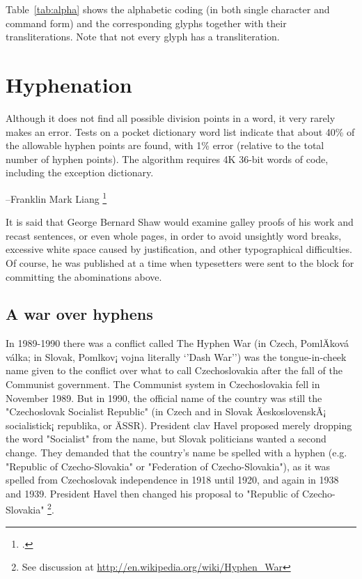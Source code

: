 Table~\ref{tab:alpha} 
shows the alphabetic coding (in both single
character and command form) and the corresponding glyphs together with their
transliterations. Note that not every glyph has a transliteration.

\begin{comment}

\begin{center}
  \Large\cartouche{\pmglyph{K:l-i-o-p-a-d:r-a}}
\end{center}
\end{comment}

\chapter{Hyphenation}
\label{ch:hyphenation}

\epigraph{Although it does not find all possible division points in a word, it very rarely makes an error. Tests on a pocket dictionary word list indicate that about 40\% of the allowable hyphen points are found, with 1\% error (relative to the total number of hyphen points). The algorithm requires 4K 36-bit words of code, including the exception dictionary.}{--Franklin Mark Liang \footcite{liang83}}

\label{ch:hyphenation} 
It is said that George Bernard Shaw would examine galley proofs of his work and recast sentences, or even whole pages, in order to avoid unsightly word breaks, excessive white space caused by justification, and other typographical difficulties. Of course, he was published at a time when typesetters were sent to the block for committing the abominations above.\cite{Major1991} 

\section{A war over hyphens}

In 1989-1990 there was a conflict called The Hyphen War (in Czech, PomlÄkov\'a v\' alka; in Slovak, Pomlkov¡ vojna literally `'Dash War'') was the tongue-in-cheek name given to the conflict over what to call Czechoslovakia after the fall of the Communist government. The Communist system in Czechoslovakia fell in November 1989. But in 1990, the official name of the country was still the "Czechoslovak Socialist Republic" (in Czech and in Slovak ÄeskoslovenskÃ¡ socialistick¡ republika, or ÄSSR). President clav Havel proposed merely dropping the word "Socialist" from the name, but Slovak politicians wanted a second change. They demanded that the country's name be spelled with a hyphen (e.g. "Republic of Czecho-Slovakia" or "Federation of Czecho-Slovakia"), as it was spelled from Czechoslovak independence in 1918 until 1920, and again in 1938 and 1939. President Havel then changed his proposal to "Republic of Czecho-Slovakia" \footnote{See discussion at \url{http://en.wikipedia.org/wiki/Hyphen_War}}. 

